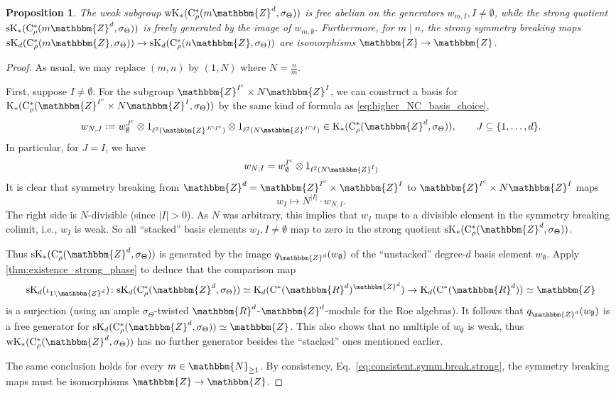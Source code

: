 \documentclass{amsart}
\numberwithin{figure}{section}
\numberwithin{equation}{section}
\numberwithin{table}{section}
\theoremstyle{plain}
\newtheorem{proposition}[equation]{Proposition}
\theoremstyle{definition}
\theoremstyle{remark}
\theoremstyle{nonumber}
\newcommand{\N}{\mathbb{N}}
\newcommand{\Z}{\mathbb{Z}}
\newcommand{\R}{\mathbb{R}}
\newcommand{\K}{\relax\ifmmode\operatorname{K}\else\textup{K}\fi}
\newcommand{\Cst}{\relax\ifmmode\mathrm{C}^*\else\textup{C*}\fi}
\newcommand{\Cstr}{\Cst_\rho} %
\newcommand{\defeq}{\mathrel{\vcentcolon=}}
\renewcommand{\mathbb}{\mathbbm} %
\begin{document}
\begin{proposition}\label{prop:strong.basis}
The weak subgroup ${\rm wK}_*(\Cstr(m\Z^d,\sigma_\Theta))$ is free abelian on the generators $w_{m,I}, I\neq \emptyset$, while the strong quotient ${\rm sK}_*(\Cstr(m\Z^d,\sigma_\Theta))$ is freely generated by the image of $w_{m,\emptyset}$. Furthermore, for $m\mid n$, the strong symmetry breaking maps ${\rm sK}_d(\Cstr(m\Z,\sigma_\Theta))\to {\rm sK}_d(\Cstr(n\Z,\sigma_\Theta))$ are isomorphisms $\Z\to\Z$.
\end{proposition}
\begin{proof}
As usual, we may replace $(m,n)$ by $(1,N)$ where $N=\frac{n}{m}$.

First, suppose $I\neq \emptyset$. For the subgroup $\Z^{I^\mathrm{c}}\times N\Z^I$, we can construct a basis for $\K_*(\Cstr(\Z^{I^\mathrm{c}}\times N\Z^I,\sigma_\Theta))$ by the same kind of formula as \eqref{eq:higher_NC_basis_choice},
\[
w_{N,J}\defeq w^{J^\mathrm{c}}_\emptyset\otimes 1_{\ell^2(\Z^{J\cap I^\mathrm{c}})}\otimes 1_{\ell^2(N\Z^{J\cap I})}\in\K_*(\Cstr(\Z^d,\sigma_\Theta)),\qquad J\subseteq\{1,\ldots,d\}.
\]
In particular, for $J=I$, we have
\[
w_{N;I}=w^{I^\mathrm{c}}_\emptyset\otimes 1_{\ell^2(N\Z^{I})}
\]
It is clear that symmetry breaking from $\Z^d=\Z^{I^\mathrm{c}}\times \Z^I$ to $\Z^{I^\mathrm{c}}\times N\Z^I$ maps
\begin{equation}\label{eq:partial.weak.symm.breaking}
w_I\mapsto N^{|I|}\cdot w_{N,I}.
\end{equation}
The right side is $N$-divisible (since $|I|>0$). As $N$ was arbitrary, this implies that $w_I$ maps to a divisible element in the symmetry breaking colimit, i.e., $w_I$ is weak. So all ``stacked'' basis elements $w_I, I\neq\emptyset$ map to zero in the strong quotient ${\rm sK}_*(\Cstr(\Z^d,\sigma_\Theta))$.

Thus ${\rm sK}_*(\Cstr(\Z^d,\sigma_\Theta))$ is generated by the image
$q_{\Z^d}(w_\emptyset)$ of the ``unstacked'' degree-$d$ basis element
$w_\emptyset$. Apply \cref{thm:existence_strong_phase} to deduce
that the comparison map 
\[
{\rm sK}_d(\iota_{1\backslash \Z^d})\colon {\rm sK}_d(\Cstr(\Z^d,\sigma_\Theta))\simeq \K_d(\Cst(\R^d)^{\Z^d})\to \K_d(\Cst(\R^d))\simeq \Z
\]
is a surjection (using an ample $\sigma_\Theta$-twisted
$\R^d$-$\Z^d$-module for the Roe algebras). It follows that $q_{\Z^d}(w_\emptyset)$ is a free generator for ${\rm sK}_d(\Cstr(\Z^d,\sigma_\Theta))\simeq\Z$. This also shows that no multiple of $w_\emptyset$ is weak, thus ${\rm wK}_*(\Cstr(\Z^d,\sigma_\Theta))$ has no further generator besides the ``stacked'' ones mentioned earlier.

The same conclusion holds for every $m\in\N_{\geq 1}$. By consistency,
Eq.~\eqref{eq:consistent.symm.break.strong}, the symmetry breaking maps
must be isomorphisms $\Z\to\Z$.
\end{proof}
\end{document}
